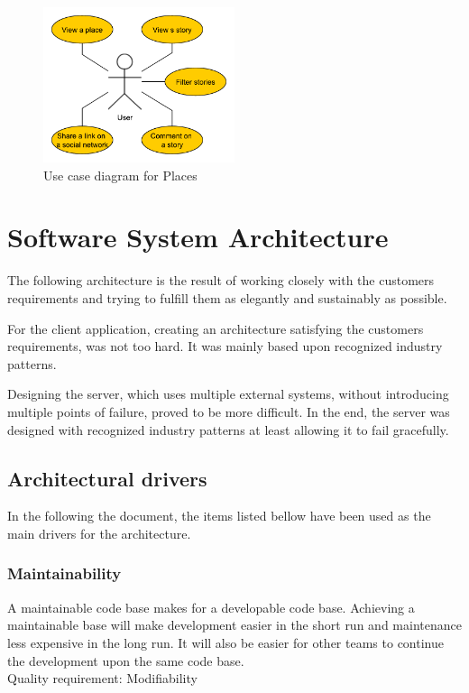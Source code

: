 \documentclass[11pt]{book}
\begin{document}
\begin{figure}[H]
      \centering
      \includegraphics[width=0.5\textwidth]{Figures/Requirements/final.pdf}
      \caption{Use case diagram for Places}
      \label{fig:req_usecase_walls}
\end{figure}

\chapter{Software System Architecture}\label{chap:architecture}
The following architecture is the result of working closely with the customers requirements and trying to fulfill them as elegantly and sustainably as possible.

For the client application, creating an architecture satisfying the customers requirements, was not too hard. It was  mainly based upon recognized industry patterns.

Designing the server, which uses multiple external systems, without introducing multiple points of failure, proved to be more difficult. In the end, the server was designed with recognized industry patterns at least allowing it to fail gracefully.

\section{Architectural drivers} \label{sec:architecture_drivers}
In the following the document, the items listed bellow have been used as the main drivers for the architecture.

\subsection{Maintainability} 
A maintainable code base makes for a developable code base. Achieving a maintainable base will make development easier in the short run and maintenance less expensive in the long run. It will also be easier for other teams to continue the development upon the same code base.\\
Quality requirement: Modifiability
\end{document}
